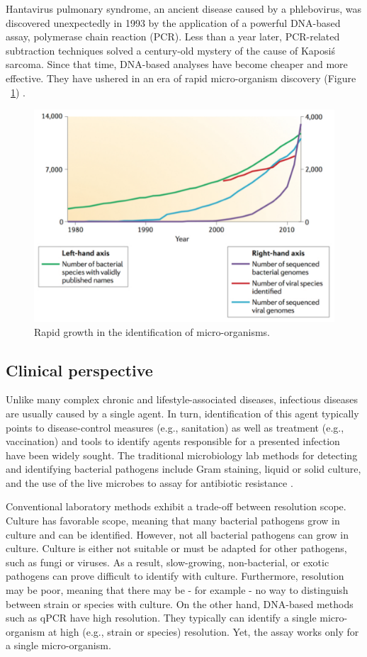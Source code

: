 Hantavirus pulmonary syndrome, an ancient disease caused by a phlebovirus, was discovered unexpectedly in 1993 by the application of a powerful DNA-based assay, polymerase chain reaction (PCR). Less than a year later, PCR-related subtraction techniques solved a century-old mystery of the cause of Kaposi\'s sarcoma. Since that time, DNA-based analyses have become cheaper and more effective. They have ushered in an era of rapid micro-organism discovery (Figure ~\ref{fig:Fig1}) \cite{Fournier:2013ewa}.

\begin{figure}
\center\includegraphics[width=120mm,scale=0.5]{Figures/Fig1}
\caption{Rapid growth in the identification of micro-organisms.}
\label{fig:Fig1}
\end{figure}

\subsection{Clinical perspective}

Unlike many complex chronic and lifestyle-associated diseases, infectious diseases are usually caused by a single agent. In turn, identification of this agent typically points to disease-control measures (e.g., sanitation) as well as treatment (e.g., vaccination) \cite{Fauci:2012us} and tools to identify agents responsible for a presented infection have been widely sought. The traditional microbiology lab methods for detecting and identifying bacterial pathogens include Gram staining, liquid or solid culture, and the use of the live microbes to assay for antibiotic resistance \cite{Boyd:2013cc}.

Conventional laboratory methods exhibit a trade-off between resolution scope. Culture has favorable scope, meaning that many bacterial pathogens grow in culture and can be identified. However, not all bacterial pathogens can grow in culture. Culture is either not suitable or must be adapted for other pathogens, such as fungi or viruses. As a result, slow-growing, non-bacterial, or exotic pathogens can prove difficult to identify with culture. Furthermore, resolution may be poor, meaning that there may be - for example - no way to distinguish between strain or species with culture. On the other hand, DNA-based methods such as qPCR have high resolution. They typically can identify a single micro-organism at high (e.g., strain or species) resolution. Yet, the assay works only for a single micro-organism.

